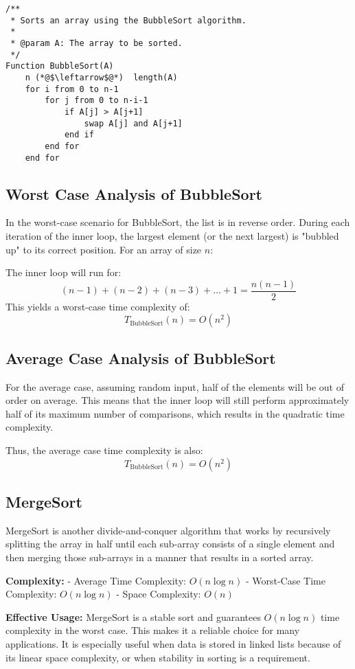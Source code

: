 \begin{lstlisting}[language=PseudoCode, caption=BubbleSort Algorithm]
/**
 * Sorts an array using the BubbleSort algorithm.
 * 
 * @param A: The array to be sorted.
 */
Function BubbleSort(A)
    n (*@$\leftarrow$@*)  length(A)
    for i from 0 to n-1
        for j from 0 to n-i-1
            if A[j] > A[j+1]
                swap A[j] and A[j+1]
            end if
        end for
    end for
\end{lstlisting}

\subsection{Worst Case Analysis of BubbleSort}
In the worst-case scenario for BubbleSort, the list is in reverse order. During each iteration of the inner loop, the largest element (or the next largest) is "bubbled up" to its correct position. For an array of size \( n \):

The inner loop will run for:
\[
(n-1) + (n-2) + (n-3) + \dots + 1 = \frac{n(n-1)}{2}
\]
This yields a worst-case time complexity of:
\[
T_{\text{BubbleSort}}(n) = O(n^2)
\]

\subsection{Average Case Analysis of BubbleSort}
For the average case, assuming random input, half of the elements will be out of order on average. This means that the inner loop will still perform approximately half of its maximum number of comparisons, which results in the quadratic time complexity.

Thus, the average case time complexity is also:
\[
T_{\text{BubbleSort}}(n) = O(n^2)
\]


\subsection{MergeSort}

MergeSort is another divide-and-conquer algorithm that works by recursively splitting the array in half until each sub-array consists of a single element and then merging those sub-arrays in a manner that results in a sorted array.

\textbf{Complexity:}
- Average Time Complexity: \(O(n \log n)\)
- Worst-Case Time Complexity: \(O(n \log n)\)
- Space Complexity: \(O(n)\)

\textbf{Effective Usage:}
MergeSort is a stable sort and guarantees \(O(n \log n)\) time complexity in the worst case. This makes it a reliable choice for many applications. It is especially useful when data is stored in linked lists because of its linear space complexity, or when stability in sorting is a requirement.


